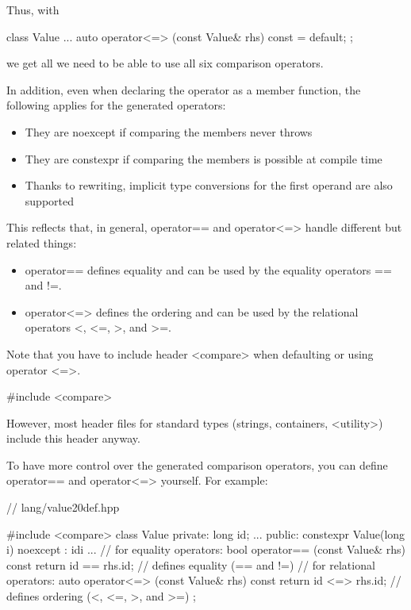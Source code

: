 Thus, with

\begin{cpp}
class Value {
	...
	auto operator<=> (const Value& rhs) const = default;
};
\end{cpp}

we get all we need to be able to use all six comparison operators.

In addition, even when declaring the operator as a member function, the following applies for the generated operators:

\begin{itemize}
\item
They are noexcept if comparing the members never throws

\item
They are constexpr if comparing the members is possible at compile time

\item
Thanks to rewriting, implicit type conversions for the first operand are also supported
\end{itemize}

This reflects that, in general, operator== and operator<=> handle different but related things:

\begin{itemize}
\item
operator== defines equality and can be used by the equality operators == and !=.

\item
operator<=> defines the ordering and can be used by the relational operators <, <=, >, and >=.
\end{itemize}

Note that you have to include header <compare> when defaulting or using operator <=>.

\begin{cpp}
#include <compare>
\end{cpp}

However, most header files for standard types (strings, containers, <utility>) include this header anyway.


To have more control over the generated comparison operators, you can define operator== and operator<=> yourself. For example:

\begin{cpp}
// lang/value20def.hpp

#include <compare>
class Value {
private:
	long id;
	...
public:
	constexpr Value(long i) noexcept
	: id{i} {
	}
	...
	// for equality operators:
	bool operator== (const Value& rhs) const {
		return id == rhs.id; // defines equality (== and !=)
	}
	// for relational operators:
	auto operator<=> (const Value& rhs) const {
		return id <=> rhs.id; // defines ordering (<, <=, >, and >=)
	}
};
\end{cpp}


